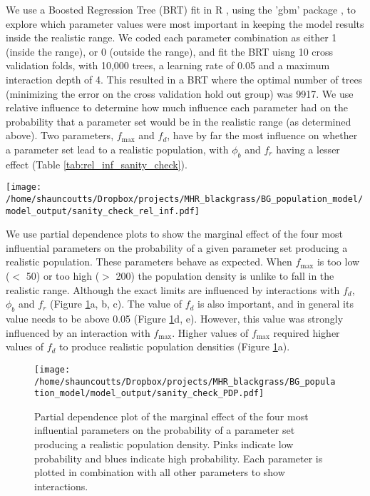 \documentclass[12pt,a4paper]{article}
\begin{document}
We use a Boosted Regression Tree (BRT) fit in R \citep{Rstat}, using the 'gbm' package \citep{Ridg2013}, to explore which parameter values were most important in keeping the model results inside the realistic range. We coded each parameter combination as either 1 (inside the range), or 0 (outside the range), and fit the BRT uisng 10 cross validation folds, with 10,000 trees, a learning rate of 0.05 and a maximum interaction depth of 4. This resulted in a BRT where the optimal number of trees (minimizing the error on the cross validation hold out group) was 9917. We use relative influence \citep{Frie2001, Elit2008} to determine how much influence each parameter had on the probability that a parameter set would be in the realistic range  (as determined above).    Two parameters, $f_\text{max}$ and $f_d$, have by far the most influence on whether a parameter set lead to a realistic population, with $\phi_b$ and $f_r$ having a lesser effect (Table \ref{tab:rel_inf_sanity_check}).  

\begin{table}[H]
	\caption{Relative influence of each parameter on the probability that a given parameter set will be in the realistic range. Relative influence sums to 1 over all parameters, with higher values indicating parameters that have more influence.}
	\label{tab:rel_inf_sanity_check}
	\centering
		\texttt{[image: /home/shauncoutts/Dropbox/projects/MHR\_blackgrass/BG\_population\_model/model\_output/sanity\_check\_rel\_inf.pdf]}
\end{table}    

We use partial dependence plots \citep{Elit2008} to show the marginal effect of the four most influential parameters on the probability of a given parameter set producing a realistic population. These parameters behave as expected. When $f_\text{max}$ is too low ($<$ 50) or too high ($>$ 200) the population density is unlike to fall in the realistic range. Although the exact limits are influenced by interactions with $f_d$, $\phi_b$ and $f_r$ (Figure \ref{fig:PDP_sanity_check}a, b, c). The value of $f_d$ is also important, and in general its value needs to be above 0.05 (Figure \ref{fig:PDP_sanity_check}d, e). However, this value was strongly influenced by an interaction with $f_\text{max}$. Higher values of $f_\text{max}$ required higher values of $f_d$ to produce realistic population densities (Figure \ref{fig:PDP_sanity_check}a).    

\begin{figure}[H] 
	\texttt{[image: /home/shauncoutts/Dropbox/projects/MHR\_blackgrass/BG\_population\_model/model\_output/sanity\_check\_PDP.pdf]}
	\caption{Partial dependence plot of the marginal effect of the four most influential parameters on the probability of a parameter set producing a realistic population density. Pinks indicate low probability and blues indicate high probability. Each parameter is plotted in combination with all other parameters to show interactions.}
	\label{fig:PDP_sanity_check}
\end{figure}
\end{document}
